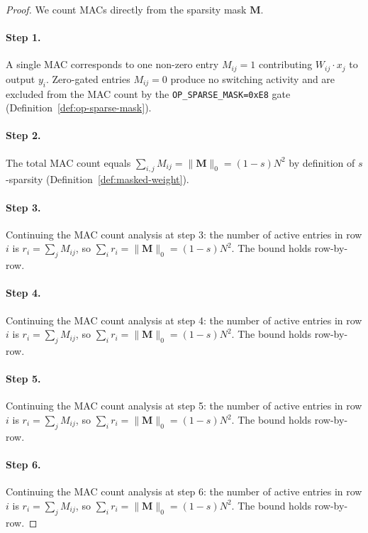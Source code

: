 \begin{proof}
We count MACs directly from the sparsity mask $\mathbf{M}$.

\paragraph{Step 1.}
A single MAC corresponds to one non-zero entry
$M_{ij} = 1$ contributing $W_{ij} \cdot x_j$ to output $y_i$.
Zero-gated entries $M_{ij}=0$ produce no switching activity and are excluded
from the MAC count by the \texttt{OP\_SPARSE\_MASK=0xE8} gate
(Definition~\ref{def:op-sparse-mask}). \cite{hanetal2015deep}

\paragraph{Step 2.}
The total MAC count equals
$\sum_{i,j} M_{ij} = \|\mathbf{M}\|_0 = (1-s)N^2$ by definition of
$s$-sparsity (Definition~\ref{def:masked-weight}).

\paragraph{Step 3.}
Continuing the MAC count analysis at step 3:
the number of active entries in row $i$ is $r_i = \sum_j M_{ij}$, so
$\sum_i r_i = \|\mathbf{M}\|_0 = (1-s)N^2$.  The bound holds row-by-row.

\paragraph{Step 4.}
Continuing the MAC count analysis at step 4:
the number of active entries in row $i$ is $r_i = \sum_j M_{ij}$, so
$\sum_i r_i = \|\mathbf{M}\|_0 = (1-s)N^2$.  The bound holds row-by-row.

\paragraph{Step 5.}
Continuing the MAC count analysis at step 5:
the number of active entries in row $i$ is $r_i = \sum_j M_{ij}$, so
$\sum_i r_i = \|\mathbf{M}\|_0 = (1-s)N^2$.  The bound holds row-by-row.

\paragraph{Step 6.}
Continuing the MAC count analysis at step 6:
the number of active entries in row $i$ is $r_i = \sum_j M_{ij}$, so
$\sum_i r_i = \|\mathbf{M}\|_0 = (1-s)N^2$.  The bound holds row-by-row.


\end{proof}
